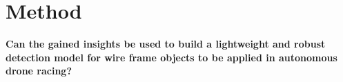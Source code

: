 \chapter{Method}
\label{sec:method}

\begin{center}
	\textbf{Can the gained insights be used to build a lightweight and robust detection model for wire frame objects to be applied in autonomous drone racing?}
\end{center}

